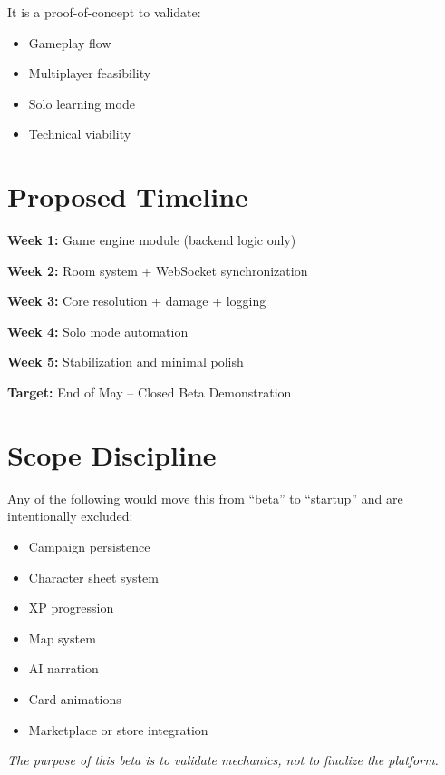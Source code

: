 \documentclass[11pt,a4paper]{article}
\begin{document}
It is a proof-of-concept to validate:

\begin{itemize}[leftmargin=2em]
    \item Gameplay flow
    \item Multiplayer feasibility
    \item Solo learning mode
    \item Technical viability
\end{itemize}

\section{Proposed Timeline}

\textbf{Week 1:} Game engine module (backend logic only)

\textbf{Week 2:} Room system + WebSocket synchronization

\textbf{Week 3:} Core resolution + damage + logging

\textbf{Week 4:} Solo mode automation

\textbf{Week 5:} Stabilization and minimal polish

\bigskip

\textbf{Target:} End of May – Closed Beta Demonstration

\section*{Scope Discipline}

Any of the following would move this from ``beta'' to ``startup'' and are intentionally excluded:

\begin{itemize}[leftmargin=2em]
    \item Campaign persistence
    \item Character sheet system
    \item XP progression
    \item Map system
    \item AI narration
    \item Card animations
    \item Marketplace or store integration
\end{itemize}

\bigskip

\noindent
\textit{The purpose of this beta is to validate mechanics, not to finalize the platform.}
\end{document}
